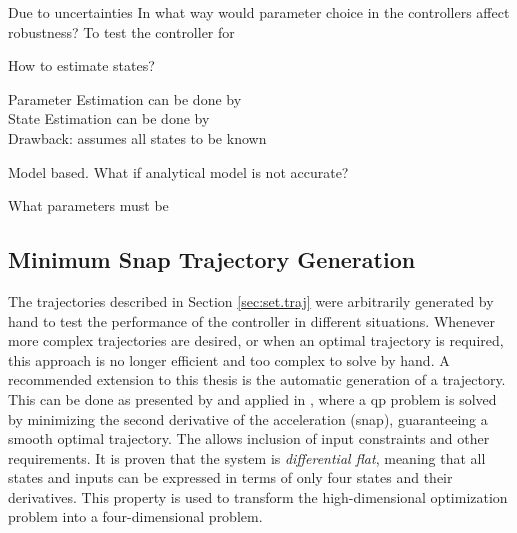 Due to uncertainties
In what way would parameter choice in the controllers affect robustness?
To test the controller for


How to estimate states?

Parameter Estimation can be done by\\

State Estimation can be done by\\

Drawback: assumes all states to be known

Model based. What if analytical model is not accurate?

What parameters must be 





\subsection{Minimum Snap Trajectory Generation}
The trajectories described in Section \ref{sec:set.traj} were arbitrarily generated by hand to test the performance of the controller in different situations. 
Whenever more complex trajectories are desired, or when an optimal trajectory is required, this approach is no longer efficient and too complex to solve by hand.
A recommended extension to this thesis is the automatic generation of a trajectory. 
This can be done as presented by \cite{Mellinger2011} and applied in \cite{Tang2014,Tang2015}, where a \acs{qp} problem is solved by minimizing the second derivative of the acceleration (snap),  guaranteeing a smooth optimal trajectory. The  allows inclusion of input constraints and other requirements. 
It is proven that the system is \textit{differential flat}, meaning that all states and inputs can be expressed in terms of only four states and their derivatives. This property is used to transform the high-dimensional optimization problem into a four-dimensional problem.

